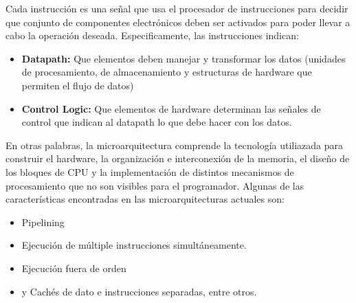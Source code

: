 Cada instrucción es una señal que usa el procesador de instrucciones para decidir que conjunto de componentes electrónicos deben ser activados para poder llevar a cabo la operación deseada. Especificamente, las instrucciones indican: 

\begin{itemize}
	\item \textbf{Datapath:} Que elementos deben manejar y transformar los datos (unidades de procesamiento, de almacenamiento y estructuras de hardware que permiten el flujo de datos)
	\item \textbf{Control Logic:} Que elementos de hardware determinan las señales de control que indican al datapath lo que debe hacer con los datos.
\end{itemize}

En otras palabras, la microarquitectura comprende la tecnología utiliazada para construir el hardware, la organización e interconexión de la memoria, el diseño de los bloques de CPU y la implementación de distintos mecanismos de procesamiento que no son visibles para el programador. Algunas de las características encontradas en las microarquitecturas actuales son:

\begin{itemize}
	\item Pipelining
	\item Ejecución de múltiple instrucciones simultáneamente.
	\item Ejecución fuera de orden
	\item y Cachés de dato e instrucciones separadas, entre otros.
\end{itemize}

